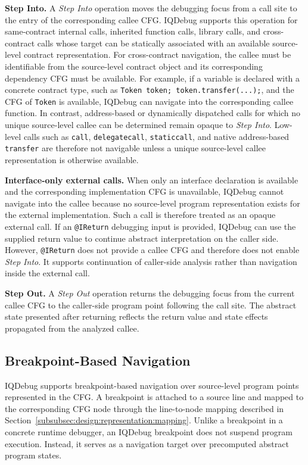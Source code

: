 \documentclass[11pt,oneside]{report}
\theoremstyle{plain}
\theoremstyle{definition}
\theoremstyle{remark}
\begin{document}
\smallskip
\noindent\textbf{Step Into.}
A \textit{Step Into} operation moves the debugging focus from a call site to the entry of the corresponding callee CFG.
IQDebug supports this operation for same-contract internal calls, inherited function calls, library calls, and cross-contract calls whose target can be statically associated with an available source-level contract representation.
For cross-contract navigation, the callee must be identifiable from the source-level contract object and its corresponding dependency CFG must be available.
For example, if a variable is declared with a concrete contract type, such as
\texttt{Token token; token.transfer(...);},
and the CFG of \texttt{Token} is available, IQDebug can navigate into the corresponding callee function.
In contrast, address-based or dynamically dispatched calls for which no unique source-level callee can be determined remain opaque to \textit{Step Into}.
Low-level calls such as
\texttt{call},
\texttt{delegatecall},
\texttt{staticcall},
and native address-based \texttt{transfer}
are therefore not navigable unless a unique source-level callee representation is otherwise available.

\smallskip
\noindent\textbf{Interface-only external calls.}
When only an interface declaration is available and the corresponding implementation CFG is unavailable, IQDebug cannot navigate into the callee because no source-level program representation exists for the external implementation.
Such a call is therefore treated as an opaque external call.
If an \texttt{@IReturn} debugging input is provided, IQDebug can use the supplied return value to continue abstract interpretation on the caller side.
However, \texttt{@IReturn} does not provide a callee CFG and therefore does not enable \textit{Step Into}.
It supports continuation of caller-side analysis rather than navigation inside the external call.

\smallskip
\noindent\textbf{Step Out.}
A \textit{Step Out} operation returns the debugging focus from the current callee CFG to the caller-side program point following the call site.
The abstract state presented after returning reflects the return value and state effects propagated from the analyzed callee.

\subsection{Breakpoint-Based Navigation}
\label{subsec:design:navigation-breakpoint}
IQDebug supports breakpoint-based navigation over source-level program points represented in the CFG.
A breakpoint is attached to a source line and mapped to the corresponding CFG node through the line-to-node mapping described in Section~\ref{subsubsec:design:representation:mapping}.
Unlike a breakpoint in a concrete runtime debugger, an IQDebug breakpoint does not suspend program execution.
Instead, it serves as a navigation target over precomputed abstract program states.
\end{document}
